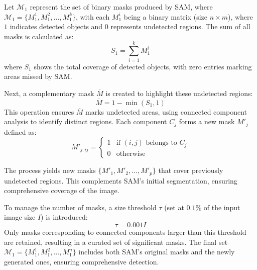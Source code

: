 Let $\mathcal{M}_1$ represent the set of binary masks produced by SAM, where $\mathcal{M}_1 = \{M_1^1, M_1^2, \ldots, M_1^k\}$, with each $M_1^i$ being a binary matrix (size $n \times m$), where $1$ indicates detected objects and $0$ represents undetected regions. The sum of all masks is calculated as:
\begin{equation*}
S_1 = \sum_{i=1}^{k} M_1^i
\end{equation*}
where \(S_1\) shows the total coverage of detected objects, with zero entries marking areas missed by SAM.

Next, a complementary mask \( \overline{M} \) is created to highlight these undetected regions:
\begin{equation*}
\overline{M} = 1 - \min(S_1, 1)
\end{equation*}
This operation ensures \( \overline{M} \) marks undetected areas, using connected component analysis to identify distinct regions. Each component \(C_j\) forms a new mask $M'_j$ defined as:
\begin{equation} 
M'_{j,ij} = \begin{cases} 
   1 & \text{if } (i, j) \text{ belongs to } C_j \\
   0 & \text{otherwise} 
   \end{cases}
\end{equation}

The process yields new masks \( \{M'_1, M'_2, \ldots, M'_p\} \) that cover previously undetected regions. This complements SAM’s initial segmentation, ensuring comprehensive coverage of the image.

To manage the number of masks, a size threshold \( \tau \) (set at $0.1\%$ of the input image size $I$) is introduced:
\begin{equation} 
\tau = 0.001I 
\end{equation}
Only masks corresponding to connected components larger than this threshold are retained, resulting in a curated set of significant masks. The final set \( \mathcal{M}_1 = \{M_1^1, M_1^2, \ldots, M_1^n\} \) includes both SAM's original masks and the newly generated ones, ensuring comprehensive detection.

